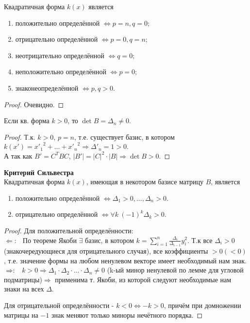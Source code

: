 \begin{subtheorem}
    Квадратичная форма $k(x)$ является
    \begin{enumerate}
        \item положительно определённой $\Leftrightarrow p = n, q = 0$;
        \item отрицательно определённой $\Leftrightarrow p = 0, q = n$;
        \item неотрицательно определённой $\Leftrightarrow q = 0$;
        \item неположительно определённой $\Leftrightarrow p = 0$;
        \item знаконеопределённой $\Leftrightarrow p,q > 0$.
    \end{enumerate}
\end{subtheorem}
\begin{proof}
    Очевидно.
\end{proof}
\begin{lemma}
    Если кв. форма $k > 0$, то $\det B = \Delta_n \neq 0$.
\end{lemma}
\begin{proof}
    Т.к. $k>0$, $p = n$, т.е. существует базис, в котором $k(x') = {x'_1}^2 + ... + {x'_n}^2 \Rightarrow \Delta'_n = 1 > 0$.\\
    А так как $B' = C^TBC$, $|B'| = |C|^2\cdot|B| \Rightarrow \det B > 0$.
\end{proof}
\begin{theorem} \textbf{Критерий Сильвестра}\\
    Квадратичная форма $k(x)$, имеющая в некотором базисе матрицу $B$, является
    \begin{enumerate}
        \item положительно определённой $\Leftrightarrow \Delta_1 > 0,...,\Delta_n > 0$.
        \item отрицательно определённой $\Leftrightarrow \forall k \ (-1)^k\Delta_k > 0$.
    \end{enumerate} 
\end{theorem}
\begin{proof} Для положительной определённости: \\
    $\Leftarrow : \ \ $ По теореме Якоби $\exists$ базис, в котором $k = \sum \limits_{i=1}^{n} \frac{\Delta_i}{\Delta_{i-1}}y_i^2$. Т.к все $\Delta_i > 0$ (знакочередующиеся для отрицательного случая), все коэффициенты $> 0 (< 0)$, т.е. значение формы на любом ненулевом векторе имеет необходимый нам знак.\\
    $\\ \Rightarrow : \ \ $ $k>0 \Rightarrow \Delta_1\cdot\Delta_2\cdot...\cdot\Delta_n \neq 0$ (k-ый минор ненулевой по лемме для угловой подматрицы)$ \Rightarrow$ применима т. Якоби, из которой следуют необходимые нам знаки на всех $\Delta$.

    Для отрицательной определённости - $k < 0 \Leftrightarrow -k > 0$, причём при домножении матрицы на $-1$ знак меняют только миноры нечётного порядка. 
\end{proof}
